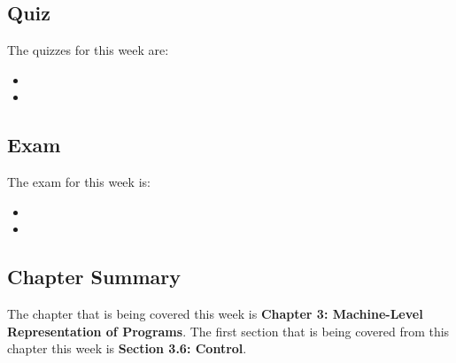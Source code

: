 \subsection{Quiz}

The quizzes for this week are:

\begin{itemize}
    \item {}
    \item {}
\end{itemize}

\subsection{Exam}

The exam for this week is:

\begin{itemize}
    \item {}
    \item {}
\end{itemize}

\subsection{Chapter Summary}

The chapter that is being covered this week is \textbf{Chapter 3: Machine-Level Representation of Programs}. The first section that is being covered from this chapter this week is \textbf{Section 3.6: Control}.


